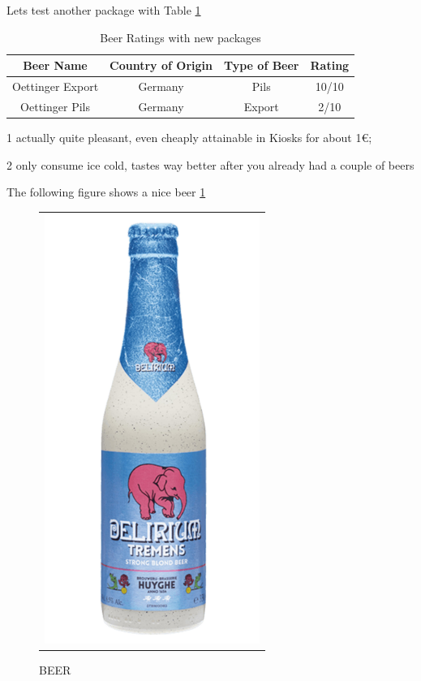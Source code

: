 \documentclass{article}
\begin{document}
\par
Lets test another package with Table \ref{table:2}
\begin{table}[h]
\begin{center}
\begin{threeparttable}
\begin{tabular}{c c c c}
    \toprule
    \textbf{Beer Name} & \textbf{Country of Origin} & \textbf{Type of Beer} & \textbf{Rating} \\ 
    \midrule
      Oettinger Export\tnote{1}   & Germany & Pils & 10/10 \\
      Oettinger Pils\tnote{2}   & Germany & Export & 2/10 \\ 
      \bottomrule
\end{tabular}
\begin{tablenotes}
\item[1] actually quite pleasant, even cheaply attainable in Kiosks for about 1€; \item[2] only consume ice cold, tastes way better after you already had a couple of beers
\end{tablenotes}
\end{threeparttable}
\end{center}
\caption{Beer Ratings with new packages}{}
\label{table:2}
\end{table}

\par

The following figure shows a nice beer \ref{figure:1}
      \begin{figure}[htb]\center 
        \begin{tabular}{c}
          \includegraphics[width=7cm]{important_figure.jpg}
        \end{tabular}
        \caption{\footnotesize BEER}
        \label{figure:1}
      \end{figure}
\end{document}
